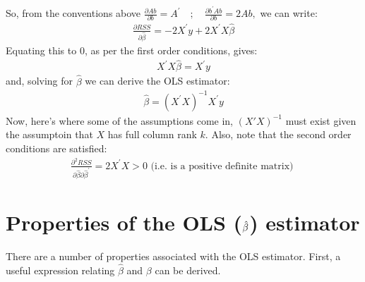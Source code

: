 \documentclass[letterpaper,10pt,english]{jupyterBook}
\begin{document}
So, from the conventions above \(
\frac{\partial A b}{\partial b}=A^{\prime} \quad ; \quad \frac{\partial b^{\prime} A b}{\partial b}=2 A b,
\) we can write:
\begin{equation*}
\begin{split}
\frac{\partial R S S}{\partial \hat{\beta}}=-2 X^{\prime} y+2 X^{\prime} X \hat{\beta}
\end{split}
\end{equation*}
Equating this to 0, as per the first order conditions, gives:
\begin{equation*}
\begin{split}
X^{\prime} X \hat{\beta}=X^{\prime} y
\end{split}
\end{equation*}
and, solving for \(\hat \beta\) we can derive the OLS estimator:
\begin{equation*}
\begin{split}
\hat{\beta}=\left(X^{\prime} X\right)^{-1} X^{\prime} y
\end{split}
\end{equation*}
Now, here’s where some of the assumptions come in, \((X'X)^{-1}\) must exist given the assumptoin that \(X\) has full column rank \(k\).  Also, note that the second order conditions are satisfied:
\begin{equation*}
\begin{split}
\frac{\partial^{2} R S S}{\partial \hat{\beta} \partial \hat{\beta}^{\prime}}=2 X^{\prime} X>0 \text { (i.e. is a positive definite matrix) }
\end{split}
\end{equation*}

\section{Properties of the OLS (\protect\(\hat\beta\protect\)) estimator}
\label{\detokenize{parts/econometric-theory/linearmodels:properties-of-the-ols-hat-beta-estimator}}
There are a number of properties associated with the OLS estimator.
First, a useful expression relating \(\hat\beta\) and \(\beta\) can be
derived.
\end{document}
